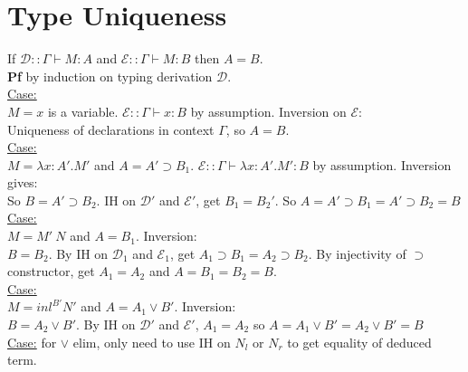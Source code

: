 \section{Type Uniqueness}
If $\mathcal{D} :: \Gamma \vdash M : A$ and $\mathcal{E} :: \Gamma
\vdash M : B$ then $A = B$.
\\ \textbf{Pf} by induction on typing derivation $\mathcal{D}$.
\\ \underline{Case:} 
\\ $M = x$ is a variable. $\mathcal{E} :: \Gamma \vdash x : B$ by
assumption. Inversion on $\mathcal{E}$: 
\\ Uniqueness of declarations in context $\Gamma$, so $A = B$.
\\ \underline{Case:} 
\\ $M = \lambda x : A'.M'$ and $A = A' \supset B_1$. $\mathcal{E} ::
\Gamma \vdash \lambda x : A'.M' : B$ by assumption. Inversion gives:
\\ So $B = A' \supset B_2$. IH on $\mathcal{D}'$ and $\mathcal{E}'$,
get $B_1 = B_2'$. So $A = A' \supset B_1 = A' \supset B_2 = B$
\\ \underline{Case:}
\\ $M = M'\ N$ and $A = B_1$. Inversion:
\\ $B = B_2$. By IH on $\mathcal{D}_1$ and $\mathcal{E}_1$, get $A_1
\supset B_1 = A_2 \supset B_2$. By injectivity of $\supset$
constructor, get $A_1 = A_2$ and $A = B_1 = B_2 = B$.
\\ \underline{Case:}
\\ $M = inl^{B'}N'$ and $A = A_1 \lor B'$. Inversion:
\\ $B = A_2 \lor B'$. By IH on $\mathcal{D}'$ and $\mathcal{E}'$,
$A_1 = A_2$ so $A = A_1 \lor B' = A_2 \lor B' = B$
\\ \underline{Case:} for $\lor$ elim, only need to use IH on $N_l$ or
$N_r$ to get equality of deduced term.
\color{Plum}
